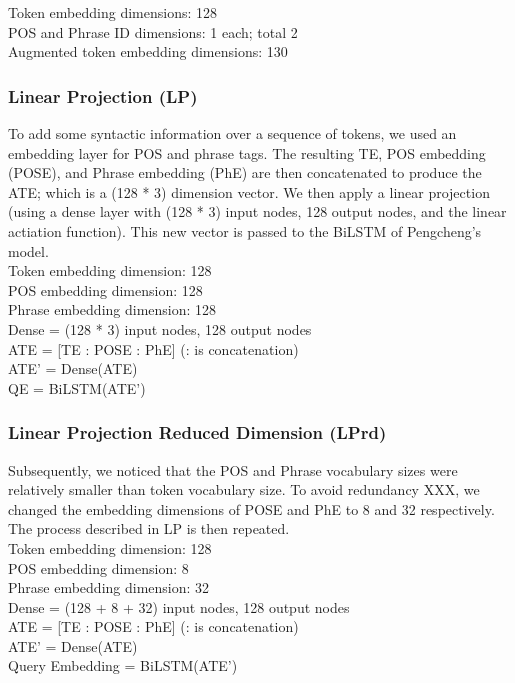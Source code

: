 \documentclass{IEEEtran}
\begin{document}
      \hspace*{-4mm}Token embedding dimensions: 128 \\
      POS and Phrase ID dimensions: 1 each; total 2 \\
      Augmented token embedding dimensions: 130 \\

      \subsubsection{Linear Projection (LP)}
      To add some syntactic information over a sequence of tokens, we used an embedding layer for
      POS and phrase tags. The resulting TE, POS embedding (POSE), and Phrase embedding (PhE) are
      then concatenated to produce the ATE; which is a (128 * 3) dimension vector. We then
      apply a linear projection (using a dense layer with (128 * 3) input nodes, 128 output nodes,
      and the linear actiation function). This new vector is passed to the BiLSTM of Pengcheng's
      model. \\

      \hspace*{-4mm}Token embedding dimension: 128 \\
      POS embedding dimension: 128 \\
      Phrase embedding dimension: 128 \\
      Dense = (128 * 3) input nodes, 128 output nodes \\ 
      ATE = [TE : POSE : PhE] (: is concatenation)\\
      ATE' = Dense(ATE) \\
      QE = BiLSTM(ATE') \\

      \subsubsection{Linear Projection Reduced Dimension (LPrd)} 
      Subsequently, we noticed that the POS and Phrase vocabulary sizes were relatively smaller
      than token vocabulary size. To avoid redundancy XXX, we changed the embedding dimensions
      of POSE and PhE to 8 and 32 respectively. The process described in LP is then repeated. \\

      \hspace*{-4mm}Token embedding dimension: 128 \\
      POS embedding dimension: 8 \\
      Phrase embedding dimension: 32 \\
      Dense = (128 + 8 + 32) input nodes, 128 output nodes \\
      ATE = [TE : POSE : PhE] (: is concatenation)\\
      ATE' = Dense(ATE) \\
      Query Embedding = BiLSTM(ATE') \\
\end{document}
